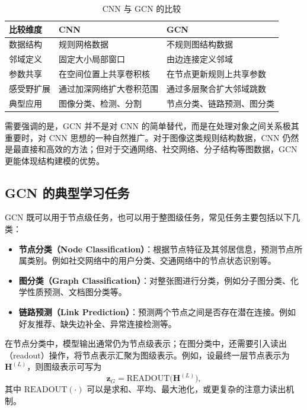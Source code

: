 \begin{table}[htbp]
    \centering
    \caption{CNN 与 GCN 的比较}
    \label{tab:cnn_gcn_compare}
    \begin{tabular}{lll}
        \toprule
        比较维度 & CNN & GCN \\
        \midrule
        数据结构 & 规则网格数据 & 不规则图结构数据 \\
        邻域定义 & 固定大小局部窗口 & 由边连接定义邻域 \\
        参数共享 & 在空间位置上共享卷积核 & 在节点更新规则上共享参数 \\
        感受野扩展 & 通过加深网络扩大卷积范围 & 通过多层聚合扩大邻域跳数 \\
        典型应用 & 图像分类、检测、分割 & 节点分类、链路预测、图分类 \\
        \bottomrule
    \end{tabular}
\end{table}

需要强调的是，GCN 并不是对 CNN 的简单替代，而是在处理对象之间关系极其重要时，对 CNN 思想的一种自然推广。对于图像这类规则结构数据，CNN 仍然是最直接和高效的方法；但对于交通网络、社交网络、分子结构等图数据，GCN 更能体现结构建模的优势。

\subsection{GCN 的典型学习任务}

GCN 既可以用于节点级任务，也可以用于整图级任务，常见任务主要包括以下几类：

\begin{itemize}
    \item \textbf{节点分类（Node Classification）}：根据节点特征及其邻居信息，预测节点所属类别。例如社交网络中的用户分类、交通网络中的节点状态识别等。
    \item \textbf{图分类（Graph Classification）}：对整张图进行分类，例如分子图分类、化学性质预测、文档图分类等。
    \item \textbf{链路预测（Link Prediction）}：预测两个节点之间是否存在潜在连接。例如好友推荐、缺失边补全、异常连接检测等。
\end{itemize}

在节点分类中，模型输出通常仍为节点级表示；在图分类中，还需要引入读出（readout）操作，将节点表示汇聚为图级表示。例如，设最终一层节点表示为 $\mathbf{H}^{(L)}$，则图级表示可写为
\begin{equation}
    \mathbf{z}_G = \mathrm{READOUT}\big(\mathbf{H}^{(L)}\big),
\end{equation}
其中 $\mathrm{READOUT}(\cdot)$ 可以是求和、平均、最大池化，或更复杂的注意力读出机制。

